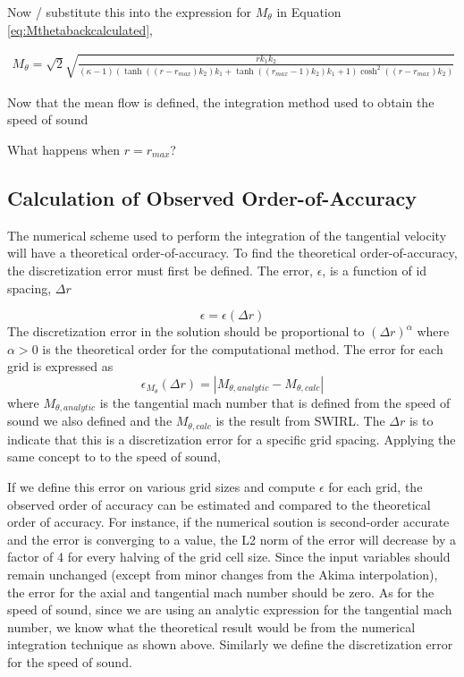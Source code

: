 \documentclass[12pt]{article}
\begin{document}
Now / substitute this into the expression for $M_{\theta}$ in Equation 
\ref{eq:Mthetabackcalculated},

\begin{align*}
    M_{\theta} = \sqrt{2}
    \sqrt{\frac{r {k}_{1} {k}_{2}}{\left(\kappa - 1\right) \left(\tanh{\left(\left(r - r_{max}\right) {k}_{2} \right)} {k}_{1} + \tanh{\left(\left(r_{max} - 1\right) {k}_{2} \right)} {k}_{1} + 1\right) \cosh^{2}{\left(\left(r - r_{max}\right) {k}_{2} \right)}}}
\end{align*} 

Now that the mean flow is defined, the integration method used to obtain the 
speed of sound

What happens when $r = r_{max}$?

\subsection{Calculation of Observed Order-of-Accuracy}
The numerical scheme used to perform the integration of the tangential velocity
will have a theoretical order-of-accuracy. To find the theoretical order-of-accuracy,
the discretization error must first be defined. The error, $\epsilon$, is a function of id spacing, $\Delta r$

\[ \epsilon = \epsilon(\Delta r) \]
The discretization error in the solution should be proportional to 
$\left( \Delta r \right)^{\alpha}$ where $\alpha > 0$ is the theoretical order
for the computational method.  The error for each grid is expressed as 
\[ \epsilon_{M_{\theta}}(\Delta r) = |M_{\theta,analytic}-M_{\theta,calc}|\]
where $M_{\theta,analytic}$ is the tangential mach number that is defined from the
speed of sound we also defined and the $M_{\theta,calc}$ is the result from 
SWIRL. The $\Delta r$ is to indicate that this is a discretization error for a
specific grid spacing. Applying the same concept to to the speed of sound,

If we define this error on various grid sizes and compute $\epsilon$ for
each grid, the observed order of accuracy can be estimated and compared to
the theoretical order of accuracy. For instance, if the numerical soution
is second-order accurate and the error is converging to a value, the L2 norm of
the error will decrease by a factor of 4 for every halving of the grid cell 
size. 
Since the input variables should remain unchanged (except from minor changes 
from the Akima interpolation), the error for the axial and tangential mach 
number should be zero. As for the speed of sound, since we are using an analytic
expression for the tangential mach number, we know what the theoretical result
would be from the numerical integration technique as shown above. 
Similarly we define the discretization error for the speed of sound.
\end{document}
